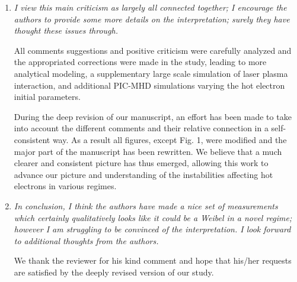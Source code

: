 \documentclass[aps,showpacs,superscriptaddress]{revtex4}%
\begin{document}
\begin{enumerate}
\item \textit{
I view this main criticism as largely all connected together; I encourage the authors to provide some more details on the interpretation; surely they have thought these issues through.}

All comments suggestions and positive criticism  were carefully analyzed and the  appropriated corrections were   made in the study, leading to more analytical modeling, a supplementary large scale simulation of laser plasma interaction, and additional  PIC-MHD simulations varying the hot electron initial parameters.

During the deep revision of our manuscript, an effort has been made to take into account the different comments and their relative connection  in a self-consistent way. As a result all figures, except Fig. 1, were modified and the major part of the manuscript has been rewritten. We believe that a much clearer and consistent picture has thus emerged, allowing this work to advance our picture and understanding of the instabilities affecting hot electrons in various regimes.




\item \textit{
In conclusion, I think the authors have made a nice set of measurements which certainly qualitatively looks like it could be a Weibel in a novel regime; however I am struggling to be convinced of the interpretation. I look forward to additional thoughts from the authors.}

We thank the reviewer for his kind comment and hope that his/her requests are satisfied by the deeply revised version of our study.


\end{enumerate}
\end{document}
